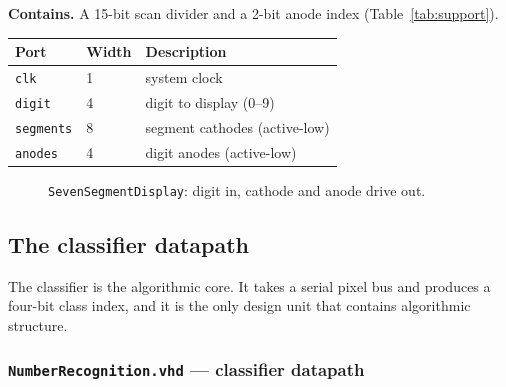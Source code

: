 \documentclass[11pt,a4paper]{article}
\begin{document}
\textbf{Contains.} A 15-bit scan divider and a 2-bit anode index
(Table~\ref{tab:support}).

\begin{center}
\small
\begin{tabularx}{\linewidth}{@{}llL@{}}
\toprule
\textbf{Port} & \textbf{Width} & \textbf{Description} \\
\midrule
\texttt{clk}      & 1  & system clock \\
\texttt{digit}    & 4  & digit to display (0--9) \\
\texttt{segments} & 8  & segment cathodes (active-low) \\
\texttt{anodes}   & 4  & digit anodes (active-low) \\
\bottomrule
\end{tabularx}
\end{center}

\begin{figure}[H]
\centering
{}
\caption{\texttt{SevenSegmentDisplay}: digit in, cathode and anode drive out.}
\label{fig:seg}
\end{figure}

\subsection{The classifier datapath}
\label{sec:classifier}

The classifier is the algorithmic core. It takes a serial pixel bus and produces
a four-bit class index, and it is the only design unit that contains algorithmic
structure.

\subsubsection{\texttt{NumberRecognition.vhd} --- classifier datapath}
\label{sub:numberrecognition}
\end{document}

